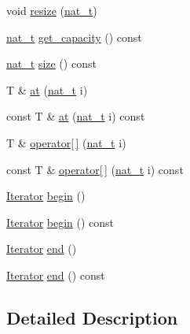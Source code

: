 \begin{DoxyCompactItemize}
void \hyperlink{class_designar_1_1_fixed_array_af52fca1277e52d28ce6d46ed4a7b471e}{resize} (\hyperlink{namespace_designar_aa72662848b9f4815e7bf31a7cf3e33d1}{nat\+\_\+t})
\item 
\hyperlink{namespace_designar_aa72662848b9f4815e7bf31a7cf3e33d1}{nat\+\_\+t} \hyperlink{class_designar_1_1_fixed_array_ac262a6be77640c4da26cd49fe9b90db0}{get\+\_\+capacity} () const
\item 
\hyperlink{namespace_designar_aa72662848b9f4815e7bf31a7cf3e33d1}{nat\+\_\+t} \hyperlink{class_designar_1_1_fixed_array_a03ce71d0cc8f4155f117bbfe83bb95e8}{size} () const
\item 
T \& \hyperlink{class_designar_1_1_fixed_array_ae47f2f299aaef27f2decc88f2fd863a9}{at} (\hyperlink{namespace_designar_aa72662848b9f4815e7bf31a7cf3e33d1}{nat\+\_\+t} i)
\item 
const T \& \hyperlink{class_designar_1_1_fixed_array_a3a1dec650628273bf08b6656db0a9088}{at} (\hyperlink{namespace_designar_aa72662848b9f4815e7bf31a7cf3e33d1}{nat\+\_\+t} i) const
\item 
T \& \hyperlink{class_designar_1_1_fixed_array_a0116aa8effdf9fd0c56ef1a8c1fa2883}{operator\mbox{[}$\,$\mbox{]}} (\hyperlink{namespace_designar_aa72662848b9f4815e7bf31a7cf3e33d1}{nat\+\_\+t} i)
\item 
const T \& \hyperlink{class_designar_1_1_fixed_array_aac0021d1ca6ff704f3d6967a509fff6b}{operator\mbox{[}$\,$\mbox{]}} (\hyperlink{namespace_designar_aa72662848b9f4815e7bf31a7cf3e33d1}{nat\+\_\+t} i) const
\item 
\hyperlink{class_designar_1_1_fixed_array_1_1_iterator}{Iterator} \hyperlink{class_designar_1_1_fixed_array_a40c099038e41c839acca94bf352753fc}{begin} ()
\item 
\hyperlink{class_designar_1_1_fixed_array_1_1_iterator}{Iterator} \hyperlink{class_designar_1_1_fixed_array_afeedbafa8456c56f80716466191810d6}{begin} () const
\item 
\hyperlink{class_designar_1_1_fixed_array_1_1_iterator}{Iterator} \hyperlink{class_designar_1_1_fixed_array_ab0baaf67153a51cb98ac12918d2387a0}{end} ()
\item 
\hyperlink{class_designar_1_1_fixed_array_1_1_iterator}{Iterator} \hyperlink{class_designar_1_1_fixed_array_a02b4949630ddc32ba5971fd4b78cf8ab}{end} () const
\end{DoxyCompactItemize}


\subsection{Detailed Description}

